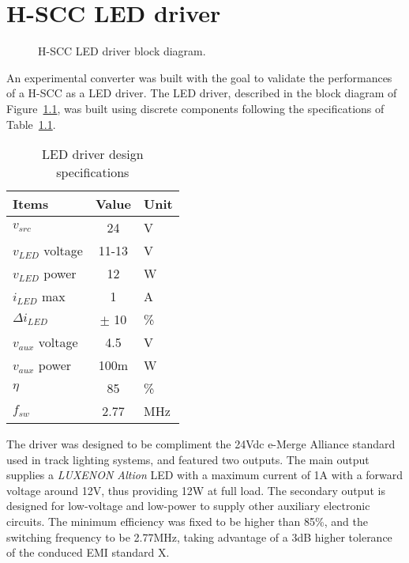 \chapter{H-SCC LED driver}
\label{ch:hscc_led_driver}


\begin{figure}[!h]
\centering

\caption[H-SCC LED driver block diagram]{H-SCC LED driver block diagram.}
\label{fig:bd_emerge_drv}
\end{figure}


An experimental converter was built with the goal to validate the performances of a H-SCC as a LED driver. The LED driver, described in the block diagram of Figure~\ref{fig:bd_emerge_drv}, was built using discrete components following the specifications of Table~\ref{tab:dsg_param_drv}. 

\begin{table}[!h]
 \caption{LED driver design specifications}\label{tab:dsg_param_drv}
 \centering 
 \renewcommand{\arraystretch}{1.2}
 \begin{tabular}{l | cl}
  Items & Value & Unit \\
  \midrule
  $v_{src}$ & 24 & V \\
  \hline
  $v_{LED}$ voltage & 11-13 & V \\
  $v_{LED}$ power & 12 & W \\
  $i_{LED}$ max & 1 & A \\
  $\Delta i_{LED}$ & $\pm$ 10 & \% \\
  \hline
  $v_{aux}$ voltage & 4.5 & V \\
  $v_{aux}$ power & 100m & W \\
  \hline
  $\eta$  & 85 & \% \\
  $f_{sw}$ & 2.77 & MHz\\
\end{tabular}
\end{table}

The driver was designed to be compliment the 24Vdc e-Merge Alliance standard used in track lighting systems, and featured two outputs. The main output supplies a \emph{LUXENON Altion} LED with a maximum current of 1A with a forward voltage around 12V, thus providing 12W at full load. The secondary output is designed for low-voltage and low-power to supply other auxiliary electronic circuits. The minimum efficiency was fixed to be higher than 85\%, and the switching frequency to be 2.77MHz, taking advantage of a 3dB higher tolerance of the conduced EMI standard X. 

